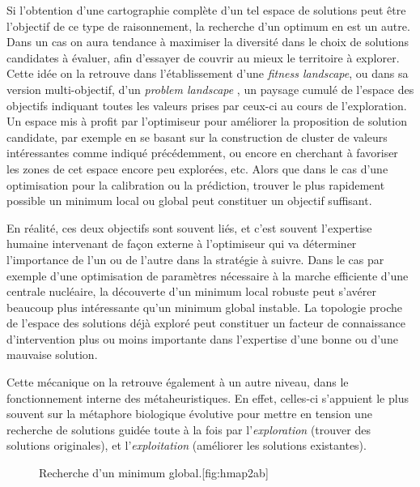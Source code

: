 Si l'obtention d'une cartographie complète d'un tel espace de solutions peut être l'objectif de ce type de raisonnement, la recherche d'un optimum en est un autre. Dans un cas on aura tendance à maximiser la diversité dans le choix de solutions candidates à évaluer, afin d'essayer de couvrir au mieux le territoire à explorer. Cette idée on la retrouve dans l'établissement d'une \textit{fitness landscape}, ou dans sa version multi-objectif, d'un \textit{problem landscape} \autocite[93-94]{Weise2011}, un paysage cumulé de l'espace des objectifs indiquant toutes les valeurs prises par ceux-ci au cours de l'exploration. Un espace mis à profit par l'optimiseur pour améliorer la proposition de solution candidate, par exemple en se basant sur la construction de cluster de valeurs intéressantes comme indiqué précédemment, ou encore en cherchant à favoriser les zones de cet espace encore peu explorées, etc. Alors que dans le cas d'une optimisation pour la calibration ou la prédiction, trouver le plus rapidement possible un minimum local ou global peut constituer un objectif suffisant.

En réalité, ces deux objectifs sont souvent liés, et c'est souvent l'expertise humaine intervenant de façon externe à l'optimiseur qui va déterminer l'importance de l'un ou de l'autre dans la stratégie à suivre. Dans le cas par exemple d'une optimisation de paramètres nécessaire à la marche efficiente d'une centrale nucléaire, la découverte d'un minimum local robuste peut s'avérer beaucoup plus intéressante qu'un minimum global instable. La topologie proche de l'espace des solutions déjà exploré peut constituer un facteur de connaissance d'intervention plus ou moins importante dans l'expertise d'une bonne ou d'une mauvaise solution.

Cette mécanique on la retrouve également à un autre niveau, dans le fonctionnement interne des métaheuristiques. En effet, celles-ci s'appuient le plus souvent sur la métaphore biologique évolutive pour mettre en tension une recherche de solutions guidée toute à la fois par l'\textit{exploration} (trouver des solutions originales), et l'\textit{exploitation} (améliorer les solutions existantes).

\begin{figure}[!htbp]
\begin{sidecaption}{Recherche d'un minimum global.}[fig:hmap2ab]
 \centering
 \qquad
\end{sidecaption}
\end{figure}


